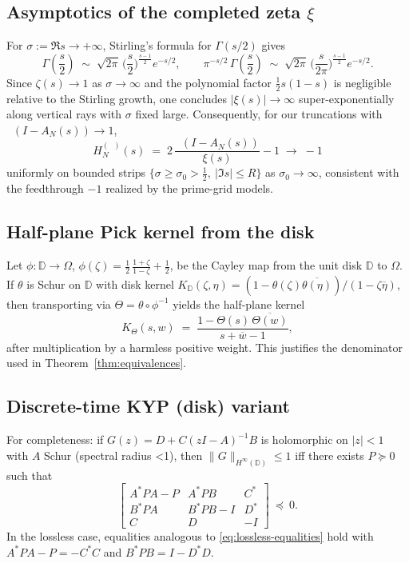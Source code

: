 \documentclass[11pt]{article}
\theoremstyle{definition}
\theoremstyle{remark}
\DeclareMathOperator{\dettwo}{det_2}
\begin{document}
\subsection{Asymptotics of the completed zeta \(\xi\)}\label{app:xi-asymptotics}
For \(\sigma:=\Re s\to+\infty\), Stirling's formula for \(\Gamma(s/2)\) gives
\[
 \Gamma\!\left(\frac{s}{2}\right)\;\sim\;\sqrt{2\pi}\,\Big(\frac{s}{2}\Big)^{\frac{s-1}{2}} e^{-s/2},\qquad \pi^{-s/2}\,\Gamma\!\left(\frac{s}{2}\right)\;\sim\;\sqrt{2\pi}\,\Big(\frac{s}{2\pi}\Big)^{\frac{s-1}{2}} e^{-s/2}.
\]
Since \(\zeta(s)\to 1\) as \(\sigma\to\infty\) and the polynomial factor \(\tfrac12 s(1-s)\) is negligible relative to the Stirling growth, one concludes \(|\xi(s)|\to\infty\) super-exponentially along vertical rays with \(\sigma\) fixed large. Consequently, for our truncations with \(\dettwo(I-A_N(s))\to 1\),
\[
 H_N^{(\dettwo)}(s)\;=\;2\,\frac{\dettwo(I-A_N(s))}{\xi(s)}-1\;\longrightarrow\;-1
\]
uniformly on bounded strips \(\{\sigma\ge \sigma_0>\tfrac12,\ |\Im s|\le R\}\) as \(\sigma_0\to\infty\), consistent with the feedthrough \(-1\) realized by the prime-grid models.

\subsection{Half-plane Pick kernel from the disk}
Let \(\phi:\mathbb D\to\Omega\), \(\phi(\zeta)=\tfrac12\,\frac{1+\zeta}{1-\zeta}+\tfrac12\), be the Cayley map from the unit disk \(\mathbb D\) to \(\Omega\). If \(\theta\) is Schur on \(\mathbb D\) with disk kernel \(K_{\mathbb D}(\zeta,\eta)=(1-\theta(\zeta)\overline{\theta(\eta)})/(1-\zeta\overline{\eta})\), then transporting via \(\Theta=\theta\circ\phi^{-1}\) yields the half-plane kernel
\[
 K_\Theta(s,w)\;=\;\frac{1-\Theta(s)\,\overline{\Theta(w)}}{s+\overline{w}-1},
\]
after multiplication by a harmless positive weight. This justifies the denominator used in Theorem~\ref{thm:equivalences}.

\subsection{Discrete-time KYP (disk) variant}
For completeness: if \(G(z)=D+C(zI-A)^{-1}B\) is holomorphic on \(|z|<1\) with \(A\) Schur (spectral radius <1), then \(\|G\|_{H^\infty(\mathbb D)}\le 1\) iff there exists \(P\succeq 0\) such that
\[
 \begin{bmatrix}
  A^*PA-P & A^*PB & C^*\\
  B^*PA & B^*PB-I & D^*\\
  C & D & -I
 \end{bmatrix}\ \preceq\ 0.
\]
In the lossless case, equalities analogous to \eqref{eq:lossless-equalities} hold with \(A^*PA-P=-C^*C\) and \(B^*PB=I-D^*D\).
\end{document}
